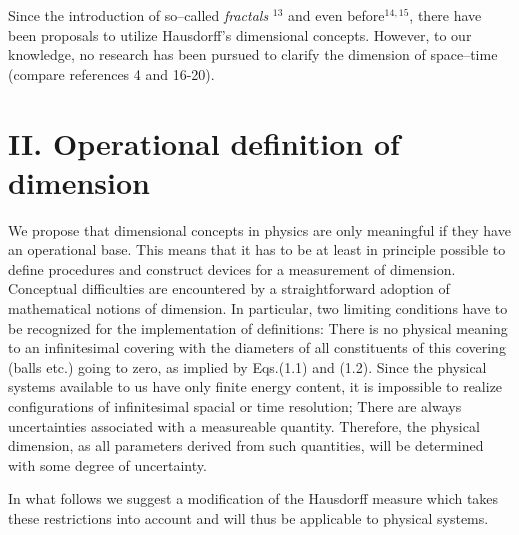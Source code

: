 Since the introduction of so--called {\it fractals
}$^{13}$ and even before$^{14,15}$,
there have been proposals to utilize Hausdorff's
dimensional concepts. However, to our knowledge, no
research has been pursued to clarify the dimension
of space--time (compare references 4 and 16-20).
\endchapter
\chapter{II. Operational definition of dimension}
We propose that dimensional concepts in physics are only meaningful
if they have an operational base.
This means that it has to be at least in principle possible
to define procedures and construct devices for a
measurement of dimension.
Conceptual difficulties are encountered by a
straightforward adoption of mathematical notions
of dimension.
In particular, two limiting conditions have to be recognized for
the implementation of definitions:
\itemize{1cm}
There is no physical meaning to an infinitesimal covering with
the diameters of all constituents of this covering (balls etc.)
going to zero, as implied by Eqs.(1.1) and (1.2). Since
the physical systems available to us have only
finite energy content, it is impossible
to realize configurations of infinitesimal spacial
or time resolution;
There are always uncertainties associated with
a measureable quantity.
Therefore, the physical dimension, as all
parameters derived from such quantities, will be determined with some
degree of uncertainty.
\enditemize

In what follows we suggest a modification of the Hausdorff
measure which takes these restrictions into account and will
thus be applicable to physical systems.
